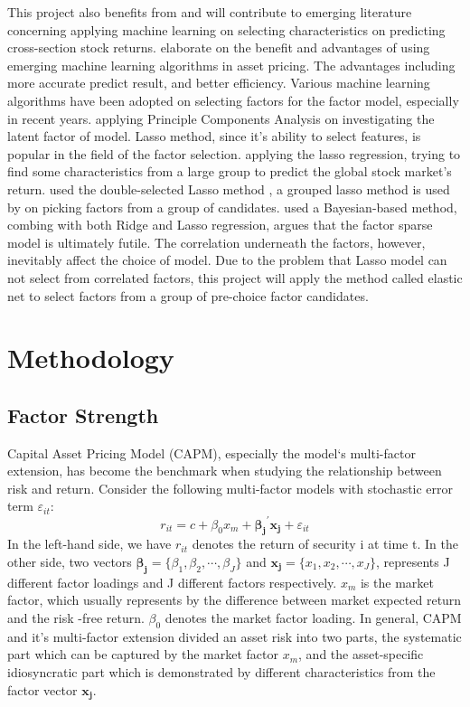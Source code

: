 \documentclass[12pt]{article}
\begin{document}
This project also benefits from and will contribute to emerging literature concerning applying machine learning on selecting characteristics on predicting cross-section stock returns. 
 elaborate on the benefit and advantages of using emerging machine learning algorithms in asset pricing. 
The advantages including more accurate predict result, and better efficiency.
Various machine learning algorithms have been adopted on selecting factors for the factor model, especially in recent years.
 applying Principle Components Analysis on investigating the latent factor of model. 
Lasso method, since it's ability to select features, is popular in the field of the factor selection.
 applying the lasso regression, trying to find some characteristics from a large group to predict the global stock market's return.
 used the double-selected Lasso method \cite{Belloni2014}, a grouped lasso method \cite{Huang2010} is used by  on picking factors from a group of candidates. 
 used a Bayesian-based method, combing with both Ridge and Lasso regression, argues that the factor sparse model is ultimately futile. 
The correlation underneath the factors, however, inevitably affect the choice of model. 
Due to the problem that Lasso model can not select from correlated factors, this project will apply the method called elastic net \cite{Zou2005} to select factors from a group of pre-choice factor candidates. 

	\section{Methodology}
			\subsection{Factor Strength}\label{strength}
Capital Asset Pricing Model (CAPM), especially the model‘s multi-factor extension, has become the benchmark when studying the relationship between risk and return. 
Consider the following multi-factor  models with stochastic error term $\varepsilon_{it}$:
\[   r_{it} = c + \beta_0 x_m + \mathbf{\beta_j}^{\prime}\mathbf{x_j} + \varepsilon_{it}  \tag{1}\label{2CAPM} \]
In the left-hand side, we have $r_{it}$ denotes the return of  security i at time t.
In the other side, two vectors $\mathbf{\beta_j }= \{\beta_1, \beta_2, \cdots, \beta_J\}$ and $\mathbf{x_j} = \{x_1, x_2, \cdots, x_J\}$,  represents J different factor loadings and J different factors respectively.
$x_m$ is the market factor, which usually represents by the difference between market expected return and the risk -free return.
$\beta_0$ denotes the market factor loading.
In general, CAPM and it's multi-factor extension divided an asset risk into two parts, the systematic part which can be captured by the market factor $x_m$, and the asset-specific idiosyncratic part which is demonstrated by different characteristics from the factor vector $\mathbf{x_j}$. 
\end{document}
